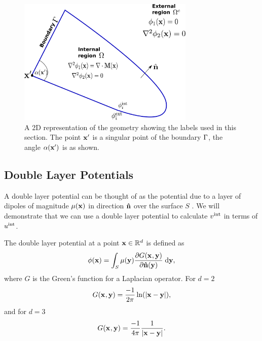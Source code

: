 \begin{figure}
  \center
  \includegraphics[width=0.75\textwidth]{./images/BEM-geometry}




  \caption{A 2D representation of the geometry showing the labels used in this section.
The point $\mathbf{x}'$ is a singular point of the boundary ${\Gamma}$, the angle $\alpha(\mathbf{x}')$ is as shown.}
  \label{fig:BEM-geometry}
\end{figure}

\subsection{Double Layer Potentials}
\label{sec:double-layer-potent}
A double layer potential can be thought of as the potential due to a layer of dipoles of magnitude $\mu(\mathbf{x})$ in direction $\mathbf{\hat{n}}$ over the surface $S$ \cite{Sternberg1946}.
We will demonstrate that we can use a double layer potential to calculate $v^{\text{int}}$ in terms of $u^{\text{int}}$.

The double layer potential at a point $\mathbf{x} \in \mathbb{R}^d$ is defined as \cite{eom_double_layer_potential}
\begin{equation}
  \label{eq:3}
  \phi(\mathbf{x}) = \int_{S} \mu(\mathbf{y}) \frac{\partial G(\mathbf{x}_{},\mathbf{y})}{\partial \mathbf{\hat{n}}(\mathbf{y})} {\; \text{d}} \mathbf{y},
\end{equation}
where $G$ is the Green's function for a Laplacian operator.
For $d=2$
\[ G(\mathbf{x}_{},\mathbf{y}) = \dfrac{-1}{2\pi}\ln(\left|{\mathbf{x} - \mathbf{y}} \right|), \]
and for $d=3$
\begin{equation} G(\mathbf{x}_{},\mathbf{y}) = \dfrac{-1}{4 \pi} \dfrac{1}{\left|{\mathbf{x} - \mathbf{y}} \right|}.
  \label{eqn:greenslaplacian3d}
\end{equation}


